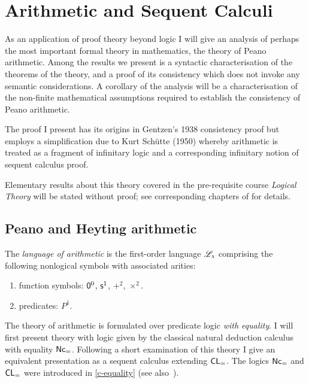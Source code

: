 %
\chapter{Arithmetic and Sequent Calculi}\label{c-oa-arith}
%
As an application of proof theory beyond logic I will give an analysis of perhaps the most important formal theory in mathematics, the theory of Peano arithmetic.
Among the results we present is a syntactic characterisation of the theorems of the theory, and a proof of its consistency which does not invoke any semantic considerations.
A corollary of the analysis will be a characterisation of the non-finite mathematical assumptions required to establish the consistency of Peano arithmetic.

The proof I present has its origins in Gentzen's 1938 consistency proof\nocite{Gen-1938} but employs a simplification due to Kurt Schütte (1950)\nocite{Schu1950} whereby arithmetic is treated as a fragment of infinitary logic and a corresponding infinitary notion of sequent calculus proof.

Elementary results about this theory covered in the pre-requisite course \emph{Logical Theory} will be stated without proof; see corresponding chapters of  for details.

\section{Peano and Heyting arithmetic}\label{s-oa-arithmetic}
%
\begin{definition}
	The \emph{language of arithmetic} is the first-order language \( \mathscr{L}_{\textsc{a}} \) comprising the following nonlogical symbols with associated arities:
	\begin{enumerate}
		\item function symbols: \( \mathsf{0}^0 \), \( \mathsf{s}^1 \), \( +^2 \), \( ×^2 \).
		\item predicates: \( P^1 \).
	\end{enumerate}
\end{definition}
%
The theory of arithmetic is formulated over predicate logic \emph{with equality}. 
I will first present theory with logic given by the classical natural deduction calculus with equality \( \mathsf{Nc_=} \).
Following a short examination of this theory I give an equivalent presentation as a sequent calculus extending \( \mathsf{CL}_= \).
The logics \( \mathsf{Nc_=} \) and \( \mathsf{CL}_= \) were introduced in \cref{c-equality} (see also~\cite[§6.5]{Negri_von_Plato}).

